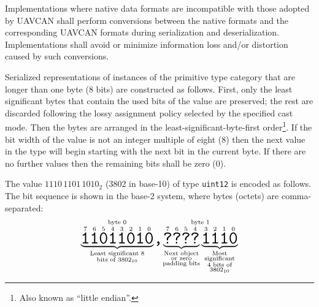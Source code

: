 Implementations where native data formats are incompatible with those adopted by UAVCAN shall perform
conversions between the native formats and the corresponding UAVCAN formats during
serialization and deserialization.
Implementations shall avoid or minimize information loss and/or distortion caused by such conversions.

Serialized representations of instances of the primitive type category that are longer than one byte (8 bits)
are constructed as follows.
First, only the least significant bytes that contain the used bits of the value are preserved;
the rest are discarded following the lossy assignment policy selected by the specified cast mode.
Then the bytes are arranged in the least-significant-byte-first order\footnote{Also known as ``little endian''.}.
If the bit width of the value is not an integer multiple of eight (8) then the next value in the type will begin
starting with the next bit in the current byte. If there are no further values then the remaining bits
shall be zero (0).

\begin{remark}
    The value $1110\,1101\,1010_2$ (3802 in base-10) of type \verb|uint12| is encoded as follows.
    The bit sequence is shown in the base-2 system, where bytes (octets) are comma-separated:
    $$
        \overset{\text{byte 0}}{%
            \underbrace{%
                \overset{7}{\hugett{1}}
                \overset{6}{\hugett{1}}
                \overset{5}{\hugett{0}}
                \overset{4}{\hugett{1}}
                \overset{3}{\hugett{1}}
                \overset{2}{\hugett{0}}
                \overset{1}{\hugett{1}}
                \overset{0}{\hugett{0}}
            }_{\substack{\text{Least significant 8} \\ \text{bits of }3802_{10}}}%
        }%
        \hugett{,}%
        \overset{\text{byte 1}}{%
            \underbrace{
                \overset{7}{\hugett{?}}
                \overset{6}{\hugett{?}}
                \overset{5}{\hugett{?}}
                \overset{4}{\hugett{?}}
            }_{\substack{\text{Next object} \\ \text{or zero} \\ \text{padding bits}}}%
            \underbrace{
                \overset{3}{\hugett{1}}
                \overset{2}{\hugett{1}}
                \overset{1}{\hugett{1}}
                \overset{0}{\hugett{0}}
            }_{\substack{\text{Most} \\ \text{significant} \\ \text{4 bits of} \\ \text{3802}_{10}}}%
        }
    $$
\end{remark}

